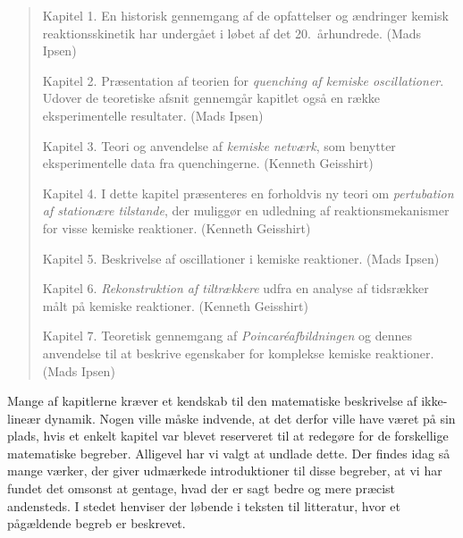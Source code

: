\begin{quote}
  \vspace{2.5mm}
  {\bsf Kapitel 1}. En historisk gennemgang af de
  opfattelser og {\ae}ndringer kemisk reaktionsskinetik har
  underg{\aa}et i l{\o}bet af det 20.\ {\aa}rhund\-rede. (Mads Ipsen)

  \vspace{2.2mm}
  {\bsf Kapitel 2}. Pr{\ae}sentation af teorien for {\em
  quenching af kemiske oscillationer\/}. Udover de
  teoretiske afsnit gennemg{\aa}r kapitlet ogs{\aa} en
  r{\ae}kke eksperimentelle resultater. (Mads Ipsen)

  \vspace{2.2mm}
  {\bsf Kapitel 3}. Teori og anvendelse af {\em kemiske
  netv{\ae}rk\/}, som benytter eksperimentelle data fra
  quenchingerne. (Kenneth Geisshirt)

  \vspace{2.2mm}
  {\bsf Kapitel 4}. I dette kapitel pr{\ae}senteres en
  forholdvis ny teori om {\em pertubation af station{\ae}re
  tilstande\/}, der muligg{\o}r en udledning af
  reaktionsmekanismer for visse kemiske reaktioner. (Kenneth Geiss\-hirt)

  \vspace{2.2mm}
  {\bsf Kapitel 5}. Beskrivelse af oscillationer i kemiske
  reaktioner. (Mads Ipsen)

  \vspace{2.2mm}
  {\bsf Kapitel 6}. {\em Rekonstruktion af tiltr{\ae}kkere\/}
  udfra en analyse af tids\-r{\ae}kker m{\aa}lt p{\aa}
  kemiske reaktioner. (Kenneth Geisshirt)

  \vspace{2.2mm}
  {\bsf Kapitel 7}. Teoretisk gennemgang af
  {\em Poincar\'{e}afbildningen\/} og dennes anvendelse til at
  beskrive egenskaber for komplekse kemiske reaktioner. (Mads Ipsen)
\end{quote}

\newpage
Mange af kapitlerne kr{\ae}ver et kendskab til den
matematiske beskrivelse af ikke-line{\ae}r dynamik. Nogen
ville m{\aa}ske indvende, at det derfor ville have
v{\ae}ret p{\aa} sin plads, hvis et enkelt kapitel var
blevet reserveret til at redeg{\o}re for de forskellige
matematiske begreber. Alligevel har vi valgt at undlade
dette. Der findes idag s{\aa} mange v{\ae}rker, der giver
udm{\ae}rkede introduktioner til disse begreber, at vi har
fundet det omsonst at gentage, hvad der er sagt bedre og
mere pr{\ae}cist andensteds. I stedet henviser der
l{\o}bende i teksten til litteratur, hvor et
p{\aa}g{\ae}ldende begreb er beskrevet.

